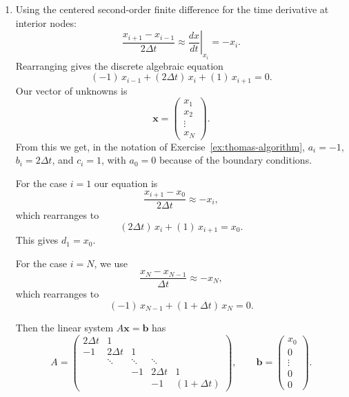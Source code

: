 \begin{solution}
    \begin{enumerate}[label=(\alph*)]

        \item Using the centered second-order finite difference for the
        time derivative at interior nodes:
        \[
            \frac{x_{i+1}-x_{i-1}}{2\Delta t}
            \approx \left.\frac{dx}{dt}\right|_{x_i} = -x_i.
        \]
        Rearranging gives the discrete algebraic equation
        \[
            (-1)\,x_{i-1} + (2\Delta t)\,x_i + (1)\,x_{i+1} = 0.
        \]
        Our vector of unknowns is
        \[
            \mathbf{x} = \begin{pmatrix} x_1 \\ x_2 \\ \vdots \\ x_N
            \end{pmatrix}.
        \]
        From this we get, in the notation of
        Exercise~\ref{ex:thomas-algorithm}, $a_i = -1$, $b_i = 2\Delta t$,
        and $c_i = 1$, with $a_0 = 0$ because of the boundary conditions.

        For the case $i = 1$ our equation is
        \[
            \frac{x_{i+1} - x_0}{2\Delta t} \approx -x_i,
        \]
        which rearranges to
        \[
            (2\Delta t)\,x_i + (1)\,x_{i+1} = x_0.
        \]
        This gives $d_1 = x_0$.

        For the case $i = N$, we use
        \[
            \frac{x_N - x_{N-1}}{\Delta t} \approx -x_N,
        \]
        which rearranges to
        \[
            (-1)\,x_{N-1} + (1 + \Delta t)\,x_N = 0.
        \]

        Then the linear system $A\mathbf{x} = \mathbf{b}$ has
        \[
        A =
        \begin{pmatrix}
        2\Delta t & 1          &        &            &               \\
        -1        & 2\Delta t  & 1      &            &               \\
                  & \ddots     & \ddots & \ddots     &               \\
                  &            & -1     & 2\Delta t  & 1             \\
                  &            &        & -1         & (1+\Delta t)
        \end{pmatrix},
        \qquad
        \mathbf{b} =
        \begin{pmatrix}
            x_0 \\[4pt] 0 \\[4pt] \vdots \\[4pt] 0 \\[4pt] 0
        \end{pmatrix}.
        \]


\end{enumerate}
\end{solution}
